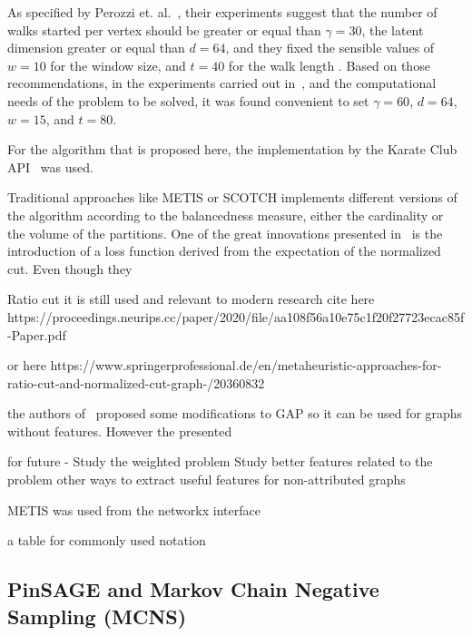 As specified by Perozzi et. al.~\cite{deepwalk}, their experiments suggest that the number of walks started per vertex should be greater or equal than $\gamma=30$, the latent dimension greater or equal than $d=64$, and they fixed the sensible values of $w=10$ for the window size, and $t=40$ for the walk length . Based on those recommendations, in the experiments carried out in~\cite{deepwalk_hyper}, and the computational needs of the problem to be solved, it was found convenient to set $\gamma=60$, $d=64$, $w=15$, and $t=80$.


For the algorithm that is proposed here, the implementation by the Karate Club API~\cite{karateclub} was used.

Traditional approaches like METIS or SCOTCH implements different versions of the algorithm according to the balancedness measure, either the cardinality or the volume of the partitions. One of the great innovations presented  in~\cite{gap} is the introduction of a loss function derived from the expectation of the normalized cut. Even though they 

Ratio cut it is still used and relevant to modern research cite here https://proceedings.neurips.cc/paper/2020/file/aa108f56a10e75c1f20f27723ecac85f-Paper.pdf

or here https://www.springerprofessional.de/en/metaheuristic-approaches-for-ratio-cut-and-normalized-cut-graph-/20360832    

the authors of~\cite{gap2} proposed some modifications to GAP so it can be used for graphs without features. However the presented 

for future - Study the weighted problem
Study better features related to the problem
other ways to extract useful features for non-attributed graphs

METIS was used from the networkx interface

a table for commonly used notation

\subsection{PinSAGE and Markov Chain Negative Sampling (MCNS)}